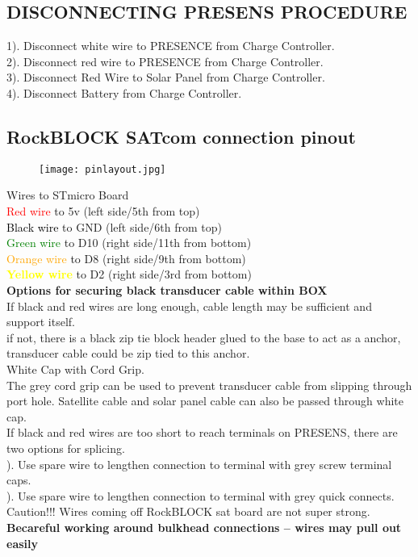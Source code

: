 \documentclass[11pt]{article}
\begin{document}
\subsection*{DISCONNECTING PRESENS PROCEDURE}
1). Disconnect white wire to PRESENCE from Charge Controller.\\
2). Disconnect red wire to PRESENCE from Charge Controller.\\
3). Disconnect Red Wire to Solar Panel from Charge Controller.\\
4). Disconnect Battery from Charge Controller.\\
\newpage
\subsection*{RockBLOCK SATcom connection pinout}
\begin{figure}[h!]	%
\centering
\captionsetup{justification=centering}%
\texttt{[image: pinlayout.jpg]}\\
\end{figure}
 Wires to STmicro Board\\
\textcolor{red}{Red wire} to 5v (left side/5th from top)\\
\textcolor{black}{Black wire} to GND (left side/6th from top)\\
\textcolor{green}{Green wire} to D10 (right side/11th from bottom)\\
\textcolor{orange}{Orange wire}  to D8 (right side/9th from bottom)\\
\textbf{\textcolor{yellow}{Yellow wire}} to D2 (right side/3rd from bottom)\\

\newpage
\noindent \textbf{Options for securing black transducer cable within BOX}\\
\noindent If black and red wires are long enough, cable length may be sufficient and support itself.\\

\noindent if not, there is a black zip tie block header glued to the base to act as a anchor, transducer cable could be zip tied to this anchor.\\

\noindent White Cap with Cord Grip.\\
\noindent The grey cord grip can be used to prevent transducer cable from slipping through port hole. Satellite cable and solar panel cable can also be passed through white cap.\\

\noindent If black and red wires are too short to reach terminals on PRESENS, there are two options for splicing.\\
). Use spare wire to lengthen connection to terminal with grey screw terminal caps.\\
). Use spare wire to lengthen connection to terminal with grey quick connects.\\ 


\noindent Caution!!! Wires coming off RockBLOCK sat board are not super strong. \textbf{Becareful working around bulkhead connections -- wires may pull out easily} \\
\end{document}
